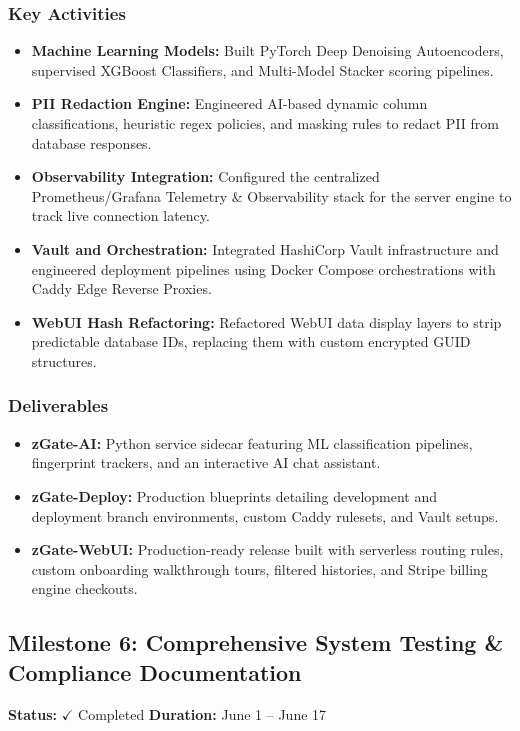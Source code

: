 \subsubsection{Key Activities}
\begin{itemize}
    \item \textbf{Machine Learning Models:} Built PyTorch Deep Denoising Autoencoders, supervised XGBoost Classifiers, and Multi-Model Stacker scoring pipelines.
    \item \textbf{PII Redaction Engine:} Engineered AI-based dynamic column classifications, heuristic regex policies, and masking rules to redact PII from database responses.
    \item \textbf{Observability Integration:} Configured the centralized Prometheus/Grafana Telemetry \& Observability stack for the server engine to track live connection latency.
    \item \textbf{Vault and Orchestration:} Integrated HashiCorp Vault infrastructure and engineered deployment pipelines using Docker Compose orchestrations with Caddy Edge Reverse Proxies.
    \item \textbf{WebUI Hash Refactoring:} Refactored WebUI data display layers to strip predictable database IDs, replacing them with custom encrypted GUID structures.
\end{itemize}

\subsubsection{Deliverables}
\begin{itemize}
    \item \textbf{zGate-AI:} Python service sidecar featuring ML classification pipelines, fingerprint trackers, and an interactive AI chat assistant.
    \item \textbf{zGate-Deploy:} Production blueprints detailing development and deployment branch environments, custom Caddy rulesets, and Vault setups.
    \item \textbf{zGate-WebUI:} Production-ready release built with serverless routing rules, custom onboarding walkthrough tours, filtered histories, and Stripe billing engine checkouts.
\end{itemize}


\subsection{Milestone 6: Comprehensive System Testing \& Compliance Documentation}
\textbf{Status:} $\checkmark$ Completed \hfill \textbf{Duration:} June 1 -- June 17

